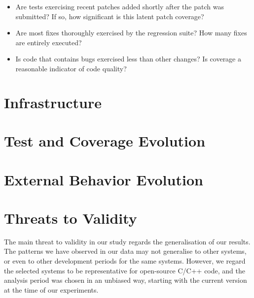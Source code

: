 \begin{itemize}
\item[\textssc{RQ7}] \textit{\rqseven}  Are
            tests exercising recent patches added shortly after the
            patch was submitted?  If so, how significant is this
            latent patch coverage?

\item[\textssc{RQ8}] \textit{\rqeight}
            Are most fixes thoroughly exercised by the regression
            suite?  How many fixes are entirely executed?

\item[\textssc{RQ9}] \textit{\rqnine}
            Is code that contains bugs exercised less than other changes?
            Is coverage a reasonable indicator of code quality? 

\end{itemize}

\section{\covrig Infrastructure}
\label{sec:design}


\section{Test and Coverage Evolution}
\label{sec:coverage-evolution}


\section{External Behavior Evolution}
\label{sec:behavior-evolution}


\section{Threats to Validity}
\label{evolution:threats}

The main threat to validity in our study regards the generalisation of
our results.  The patterns we have observed in our data may not
generalise to other systems, or even to other development periods
for the same systems.  However, we regard the selected systems to be
representative for open-source C/C++ code, and the analysis period was
chosen in an unbiased way, starting with the current version at the
time of our experiments.

